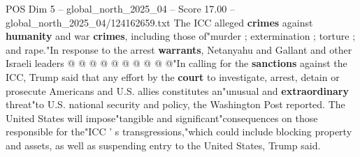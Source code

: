 \begin{textsample}{POS Dim 5 – global\_north\_2025\_04 – Score 17.00 – global\_north\_2025\_04/124162659.txt}
The ICC alleged \textbf{crimes} against \textbf{humanity} and war \textbf{crimes}, including those of"murder ; extermination ; torture ; and rape."In response to the arrest \textbf{warrants}, Netanyahu and Gallant and other Israeli leaders @ @ @ @ @ @ @ @ @ @"In calling for the \textbf{sanctions} against the ICC, Trump said that any effort by the \textbf{court} to investigate, arrest, detain or prosecute Americans and U.S. allies constitutes an"unusual and \textbf{extraordinary} threat"to U.S. national security and policy, the Washington Post reported.
The United States will impose"tangible and significant"consequences on those responsible for the"ICC ' s transgressions,"which could include blocking property and assets, as well as suspending entry to the United States, Trump said.

\end{textsample}
